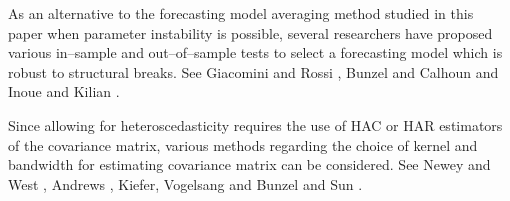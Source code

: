 As an alternative to the forecasting model averaging method studied in this paper when parameter instability is possible, several researchers have proposed various in--sample and out--of--sample tests to select a forecasting model which is robust to structural breaks. See Giacomini and Rossi \cite{giacomini_rossi_2008} \cite{giacomini_rossi_2010}, Bunzel and Calhoun \cite{bunzel_calhoun_2012} and Inoue and Kilian \cite{inoue_kilian_ER2004}.

Since allowing for heteroscedasticity requires the use of HAC or HAR estimators of the covariance matrix, various methods regarding the choice of kernel and bandwidth for estimating covariance matrix can be considered. See Newey and West \cite{newey_west_EMETRICA1987}, Andrews \cite{andrews91}, Kiefer, Vogelsang and Bunzel \cite{kvb2000} and Sun \cite{sunyixiao_2010}. 